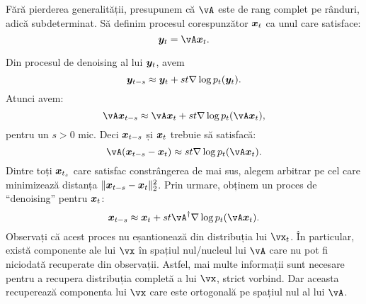 \documentclass[../../book-main_ro.tex]{subfiles}
\begin{document}
Fără pierderea generalității, presupunem că $\vA$ este de rang complet pe rânduri, adică subdeterminat. Să definim procesul corespunzător $\bm{x}_t$ ca unul care satisface:
\begin{equation}
\y_t = \vA \x_t.   
\end{equation}

Din procesul de denoising al lui $\bm{y}_t$, avem
\begin{equation}
    \bm{y}_{t-s} \approx  \bm{y}_t + st \nabla \log p_t(\bm{y}_t).
\end{equation}
Atunci avem:
\begin{equation}
    \vA\x_{t-s} \approx   \vA\x_t + st \nabla \log p_t(\vA \x_t),
\end{equation}
pentru un $s >0$ mic. Deci $\bm{x}_{t-s}$ și $\bm{x}_t$ trebuie să satisfacă:
\begin{equation}
    \vA(\x_{t-s} - \x_t) \approx st \nabla \log p_t(\vA\x_t). 
\end{equation}
Dintre toți $\bm{x}_{t_s}$ care satisfac constrângerea de mai sus, alegem arbitrar pe cel care minimizează distanța $\|\bm{x}_{t-s} - \bm{x}_t\|_2^2$. Prin urmare, obținem un proces de ``denoising'' pentru $\bm{x}_t$:
\begin{equation}
    \x_{t-s}  \approx \x_t + st\vA^\dagger \nabla \log p_t(\vA\x_t). 
\label{eqn:denoising-projection}
\end{equation}
Observați că acest proces nu eșantionează din distribuția lui $\vx_t$. În particular, există componente ale lui $\vx$ în spațiul nul/nucleul lui $\vA$ care nu pot fi niciodată recuperate din observații. Astfel, mai multe informații sunt necesare pentru a recupera distribuția completă a lui $\vx$, strict vorbind. Dar aceasta recuperează componenta lui $\vx$ care este ortogonală pe spațiul nul al lui $\vA$.
\end{document}
